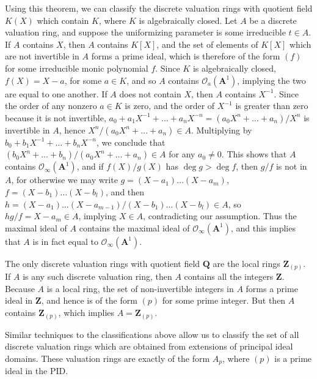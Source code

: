 \begin{example}
    Using this theorem, we can classify the discrete valuation rings with quotient field $K(X)$ which contain $K$, where $K$ is algebraically closed. Let $A$ be a discrete valuation ring, and suppose the uniformizing parameter is some irreducible $t \in A$. If $A$ contains $X$, then $A$ contains $K[X]$, and the set of elements of $K[X]$ which are not invertible in $A$ forms a prime ideal, which is therefore of the form $(f)$ for some irreducible monic polynomial $f$. Since $K$ is algebraically closed, $f(X) = X - a$, for some $a \in K$, and so $A$ contains $\mathcal{O}_a(\mathbf{A}^1)$, implying the two are equal to one another. If $A$ does not contain $X$, then $A$ contains $X^{-1}$. Since the order of any nonzero $a \in K$ is zero, and the order of $X^{-1}$ is greater than zero because it is not invertible, $a_0 + a_1X^{-1} + \dots + a_nX^{-n} = (a_0X^n + \dots + a_n)/X^n$ is invertible in $A$, hence $X^n/(a_0X^n + \dots + a_n) \in A$. Multiplying by $b_0 + b_1X^{-1} + \dots + b_nX^{-n}$, we conclude that $(b_0X^n + \dots + b_n)/(a_0X^n + \dots + a_n) \in A$ for any $a_0 \neq 0$. This shows that $A$ contains $\mathcal{O}_\infty(\mathbf{A}^1)$, and if $f(X)/g(X)$ has $\deg g > \deg f$, then $g/f$ is not in $A$, for otherwise we may write $g = (X-a_1) \dots (X-a_m)$, $f = (X-b_1) \dots (X - b_l)$, and then $h = (X-a_1) \dots (X-a_{m-1})/(X-b_1) \dots (X-b_l) \in A$, so $hg/f = X - a_m \in A$, implying $X \in A$, contradicting our assumption. Thus the maximal ideal of $A$ contains the maximal ideal of $\mathcal{O}_\infty(\mathbf{A}^1)$, and this implies that $A$ is in fact equal to $\mathcal{O}_\infty(\mathbf{A}^1)$.
\end{example}

\begin{example}
    The only discrete valuation rings with quotient field $\mathbf{Q}$ are the local rings $\mathbf{Z}_{(p)}$. If $A$ is any such discrete valuation ring, then $A$ contains all the integers $\mathbf{Z}$. Because $A$ is a local ring, the set of non-invertible integers in $A$ forms a prime ideal in $\mathbf{Z}$, and hence is of the form $(p)$ for some prime integer. But then $A$ contains $\mathbf{Z}_{(p)}$, which implies $A = \mathbf{Z}_{(p)}$.
\end{example}

Similar techniques to the classifications above allow us to classify the set of all discrete valuation rings which are obtained from extensions of principal ideal domains. These valuation rings are exactly of the form $A_p$, where $(p)$ is a prime ideal in the PID.
 
